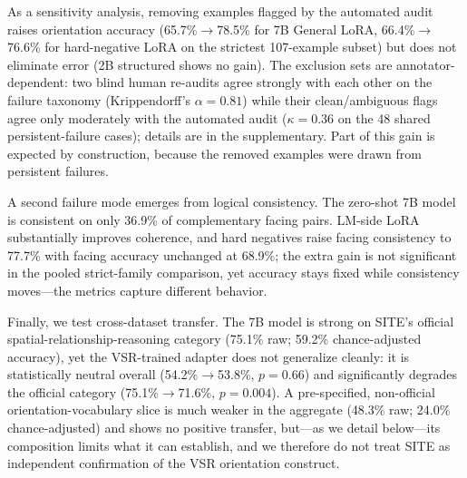 \documentclass[10pt,twocolumn,letterpaper]{article}
\begin{document}
As a sensitivity analysis, removing examples flagged by the automated audit raises orientation accuracy (65.7\%$\rightarrow$78.5\% for 7B General LoRA, 66.4\%$\rightarrow$76.6\% for hard-negative LoRA on the strictest 107-example subset) but does not eliminate error (2B structured shows no gain). The exclusion sets are annotator-dependent: two blind human re-audits agree strongly with each other on the failure taxonomy (Krippendorff's $\alpha{=}0.81$) while their clean/ambiguous flags agree only moderately with the automated audit ($\kappa{=}0.36$ on the 48 shared persistent-failure cases); details are in the supplementary. Part of this gain is expected by construction, because the removed examples were drawn from persistent failures.

A second failure mode emerges from logical consistency. The zero-shot 7B model is consistent on only 36.9\% of complementary facing pairs. LM-side LoRA substantially improves coherence, and hard negatives raise facing consistency to 77.7\% with facing accuracy unchanged at 68.9\%; the extra gain is not significant in the pooled strict-family comparison, yet accuracy stays fixed while consistency moves---the metrics capture different behavior.

Finally, we test cross-dataset transfer. The 7B model is strong on SITE's official spatial-relationship-reasoning category (75.1\% raw; 59.2\% chance-adjusted accuracy), yet the VSR-trained adapter does not generalize cleanly: it is statistically neutral overall (54.2\%$\rightarrow$53.8\%, $p=0.66$) and significantly degrades the official category (75.1\%$\rightarrow$71.6\%, $p=0.004$). A pre-specified, non-official orientation-vocabulary slice is much weaker in the aggregate (48.3\% raw; 24.0\% chance-adjusted) and shows no positive transfer, but---as we detail below---its composition limits what it can establish, and we therefore do not treat SITE as independent confirmation of the VSR orientation construct.
\end{document}
